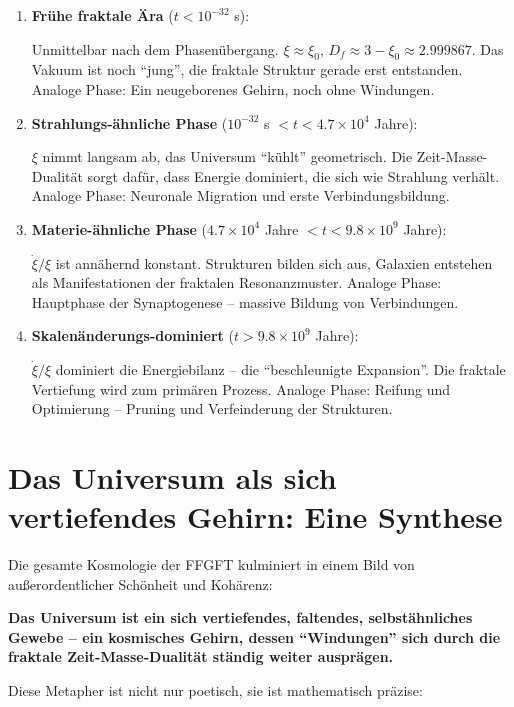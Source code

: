 \begin{enumerate}[leftmargin=*]
\item \textbf{Frühe fraktale Ära} ($t < 10^{-32}$ s): 

Unmittelbar nach dem Phasenübergang. $\xi \approx \xi_0$, $D_f \approx 3 - \xi_0 \approx 2.999867$. Das Vakuum ist noch \enquote{jung}, die fraktale Struktur gerade erst entstanden. Analoge Phase: Ein neugeborenes Gehirn, noch ohne Windungen.

\item \textbf{Strahlungs-ähnliche Phase} ($10^{-32}$ s $ < t < 4.7 \times 10^4$ Jahre):

$\xi$ nimmt langsam ab, das Universum \enquote{kühlt} geometrisch. Die Zeit-Masse-Dualität sorgt dafür, dass Energie dominiert, die sich wie Strahlung verhält. Analoge Phase: Neuronale Migration und erste Verbindungsbildung.

\item \textbf{Materie-ähnliche Phase} ($4.7 \times 10^4$ Jahre $ < t < 9.8 \times 10^9$ Jahre):

$\dot{\xi}/\xi$ ist annähernd konstant. Strukturen bilden sich aus, Galaxien entstehen als Manifestationen der fraktalen Resonanzmuster. Analoge Phase: Hauptphase der Synaptogenese -- massive Bildung von Verbindungen.

\item \textbf{Skalenänderungs-dominiert} ($t > 9.8 \times 10^9$ Jahre):

$\dot{\xi}/\xi$ dominiert die Energiebilanz -- die \enquote{beschleunigte Expansion}. Die fraktale Vertiefung wird zum primären Prozess. Analoge Phase: Reifung und Optimierung -- Pruning und Verfeinderung der Strukturen.
\end{enumerate}

\section{Das Universum als sich vertiefendes Gehirn: Eine Synthese}

Die gesamte Kosmologie der FFGFT kulminiert in einem Bild von außerordentlicher Schönheit und Kohärenz:

\textbf{Das Universum ist ein sich vertiefendes, faltendes, selbstähnliches Gewebe -- ein kosmisches Gehirn, dessen \enquote{Windungen} sich durch die fraktale Zeit-Masse-Dualität ständig weiter ausprägen.}

Diese Metapher ist nicht nur poetisch, sie ist mathematisch präzise:

